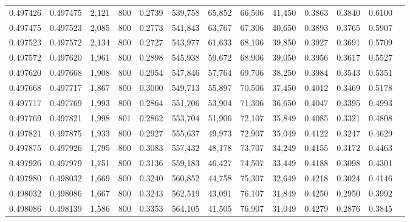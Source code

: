 \begin{tabular}{rrrrrrrrrrrrr}
0.497426 & 0.497475 &  2,121 &   800 &                                     0.2739 & 539,758 &  65,852 &  66,506 &  41,450 & 0.3863 & 0.3840 & 0.6100 \\
0.497475 & 0.497523 &  2,085 &   800 &                                     0.2773 & 541,843 &  63,767 &  67,306 &  40,650 & 0.3893 & 0.3765 & 0.5907 \\
0.497523 & 0.497572 &  2,134 &   800 &                                     0.2727 & 543,977 &  61,633 &  68,106 &  39,850 & 0.3927 & 0.3691 & 0.5709 \\
0.497572 & 0.497620 &  1,961 &   800 &                                     0.2898 & 545,938 &  59,672 &  68,906 &  39,050 & 0.3956 & 0.3617 & 0.5527 \\
0.497620 & 0.497668 &  1,908 &   800 &                                     0.2954 & 547,846 &  57,764 &  69,706 &  38,250 & 0.3984 & 0.3543 & 0.5351 \\
0.497668 & 0.497717 &  1,867 &   800 &                                     0.3000 & 549,713 &  55,897 &  70,506 &  37,450 & 0.4012 & 0.3469 & 0.5178 \\
0.497717 & 0.497769 &  1,993 &   800 &                                     0.2864 & 551,706 &  53,904 &  71,306 &  36,650 & 0.4047 & 0.3395 & 0.4993 \\
0.497769 & 0.497821 &  1,998 &   801 &                                     0.2862 & 553,704 &  51,906 &  72,107 &  35,849 & 0.4085 & 0.3321 & 0.4808 \\
0.497821 & 0.497875 &  1,933 &   800 &                                     0.2927 & 555,637 &  49,973 &  72,907 &  35,049 & 0.4122 & 0.3247 & 0.4629 \\
0.497875 & 0.497926 &  1,795 &   800 &                                     0.3083 & 557,432 &  48,178 &  73,707 &  34,249 & 0.4155 & 0.3172 & 0.4463 \\
0.497926 & 0.497979 &  1,751 &   800 &                                     0.3136 & 559,183 &  46,427 &  74,507 &  33,449 & 0.4188 & 0.3098 & 0.4301 \\
0.497980 & 0.498032 &  1,669 &   800 &                                     0.3240 & 560,852 &  44,758 &  75,307 &  32,649 & 0.4218 & 0.3024 & 0.4146 \\
0.498032 & 0.498086 &  1,667 &   800 &                                     0.3243 & 562,519 &  43,091 &  76,107 &  31,849 & 0.4250 & 0.2950 & 0.3992 \\
0.498086 & 0.498139 &  1,586 &   800 &                                     0.3353 & 564,105 &  41,505 &  76,907 &  31,049 & 0.4279 & 0.2876 & 0.3845 \\

\end{tabular}
